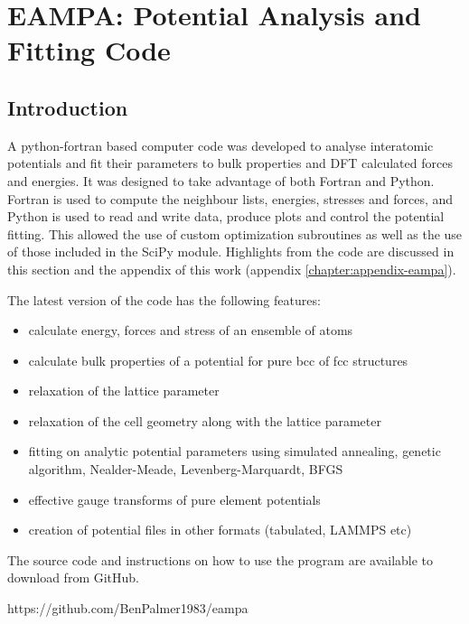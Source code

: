 \FloatBarrier
\section[EAMPA]{EAMPA: Potential Analysis and Fitting Code}
\label{code:eampa}

\subsection{Introduction}


A python-fortran based computer code was developed to analyse interatomic potentials and fit their parameters to bulk properties and DFT calculated forces and energies.  It was designed to take advantage of both Fortran and Python.  Fortran is used to compute the neighbour lists, energies, stresses and forces, and Python is used to read and write data, produce plots and control the potential fitting.  This allowed the use of custom optimization subroutines as well as the use of those included in the SciPy module.  Highlights from the code are discussed in this section and the appendix of this work (appendix \ref{chapter:appendix-eampa}).

The latest version of the code has the following features:

\begin{itemize}
\item calculate energy, forces and stress of an ensemble of atoms 
\item calculate bulk properties of a potential for pure \acrshort{bcc} of \acrshort{fcc} structures
\item relaxation of the lattice parameter 
\item relaxation of the cell geometry along with the lattice parameter
\item fitting on analytic potential parameters using simulated annealing, genetic algorithm, Nealder-Meade, Levenberg-Marquardt, BFGS
\item effective gauge transforms of pure element potentials
\item creation of potential files in other formats (tabulated, LAMMPS etc)
\end{itemize}

The source code and instructions on how to use the program are available to download from GitHub.

https://github.com/BenPalmer1983/eampa





